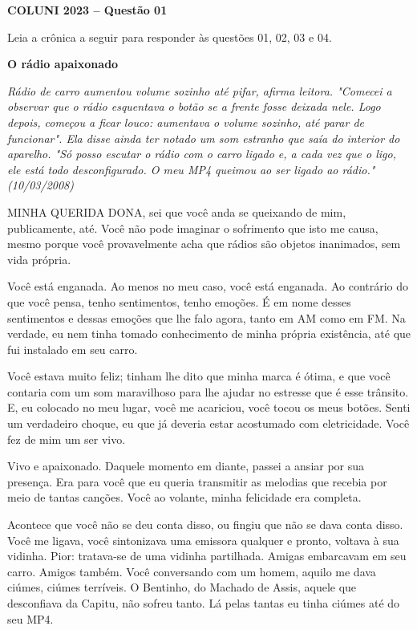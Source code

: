 \textbf{COLUNI 2023 -- Questão 01}\par\medskip Leia a crônica a seguir para responder às questões 01, 02, 03 e 04.

\par

\begin{center}\textbf{O rádio apaixonado}\end{center}

\textit{Rádio de carro aumentou volume sozinho até pifar, afirma leitora. "Comecei a observar que o rádio esquentava o botão se a frente fosse deixada nele. Logo depois, começou a ficar louco: aumentava o volume sozinho, até parar de funcionar". Ela disse ainda ter notado um som estranho que saía do interior do aparelho. "Só posso escutar o rádio com o carro ligado e, a cada vez que o ligo, ele está todo desconfigurado. O meu MP4 queimou ao ser ligado ao rádio." (10/03/2008)}

MINHA QUERIDA DONA, sei que você anda se queixando de mim, publicamente, até. Você não pode imaginar o sofrimento que isto me causa, mesmo porque você provavelmente acha que rádios são objetos inanimados, sem vida própria.

Você está enganada. Ao menos no meu caso, você está enganada. Ao contrário do que você pensa, tenho sentimentos, tenho emoções. É em nome desses sentimentos e dessas emoções que lhe falo agora, tanto em AM como em FM. Na verdade, eu nem tinha tomado conhecimento de minha própria existência, até que fui instalado em seu carro.

Você estava muito feliz; tinham lhe dito que minha marca é ótima, e que você contaria com um som maravilhoso para lhe ajudar no estresse que é esse trânsito. E, eu colocado no meu lugar, você me acariciou, você tocou os meus botões. Senti um verdadeiro choque, eu que já deveria estar acostumado com eletricidade. Você fez de mim um ser vivo.

Vivo e apaixonado. Daquele momento em diante, passei a ansiar por sua presença. Era para você que eu queria transmitir as melodias que recebia por meio de tantas canções. Você ao volante, minha felicidade era completa.

Acontece que você não se deu conta disso, ou fingiu que não se dava conta disso. Você me ligava, você sintonizava uma emissora qualquer e pronto, voltava à sua vidinha. Pior: tratava-se de uma vidinha partilhada. Amigas embarcavam em seu carro. Amigos também. Você conversando com um homem, aquilo me dava ciúmes, ciúmes terríveis. O Bentinho, do Machado de Assis, aquele que desconfiava da Capitu, não sofreu tanto. Lá pelas tantas eu tinha ciúmes até do seu MP4.

